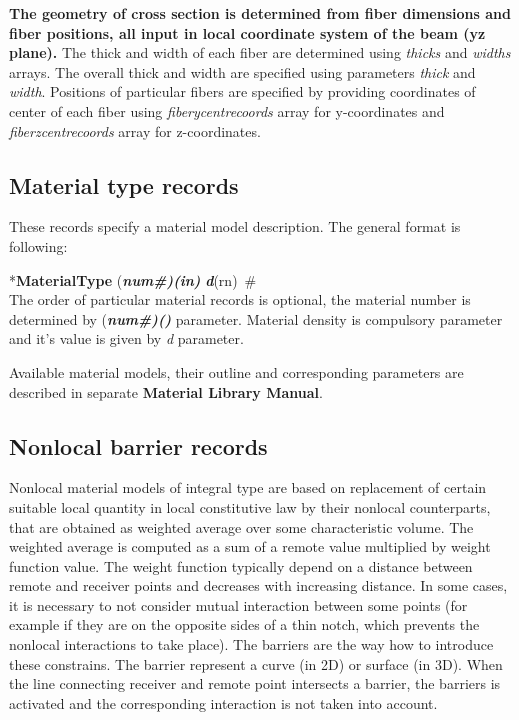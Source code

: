 \documentclass[draft]{article}
\newcommand{\param}[1]{{\em #1}}
\newcommand{\fieldVal}[2]{\mbox{({\it\bf{#1}\#)\tiny (#2)}}}
\newcommand{\keywordnotype}[1]{\mbox{{\it{\bf{#1}}}}}
\newcommand{\keyword}[2]{\mbox{{\keywordnotype{#1}\tiny (#2)}}}
\newcommand{\entKeyword}[1]{\mbox{{*{\bf{#1}}}}}
\newcommand{\entKeywordInst}[1]{\mbox{{\bf{{#1}}}}}
\newcommand{\field}[2]{\mbox{\keyword{#1}{#2}~\#}}
\begin{document}
\begin{itemize}
{\bf The geometry of cross section is determined from fiber dimensions and fiber positions, all input in local coordinate system of the beam (yz plane).} The thick and width of each fiber are determined using \param{thicks} and \param{widths} arrays. The overall thick and width are specified using parameters \param{thick} and \param{width}. Positions of particular fibers are specified by providing coordinates of center of each fiber using \param{fiberycentrecoords} array for y-coordinates and \param{fiberzcentrecoords} array for z-coordinates. 
\end{itemize}

\subsection{Material type  records}
\label{_MaterialTypeRecords}
These records specify a material model  description. The general format is
following:

\entKeyword{MaterialType} \fieldVal{num}{in} \field{d}{rn}\\

The order of particular material records is optional, the material number is determined by \fieldVal{num}{} parameter.
Material density is compulsory parameter and it's value is given by
\param{d} parameter.

Available material models, their outline and
corresponding parameters are described in separate {\bf Material Library Manual}.

\subsection{Nonlocal barrier records}
\label{_NonlocalBarrierRecords}
Nonlocal material models of integral type are based on replacement of
certain suitable local quantity in local constitutive law by their
nonlocal counterparts, that are obtained as weighted average over
some characteristic volume. The weighted average is computed as a sum
of a remote value multiplied by weight function value. The weight
function typically depend on a distance between remote and receiver
points and decreases with increasing distance. In some cases, it is
necessary to not consider mutual interaction between some points (for
example if they are on the opposite sides of a thin notch, which
prevents the nonlocal interactions to take place). The barriers are
the way how to introduce these constrains. The barrier represent a
curve (in 2D) or surface (in 3D). When the line connecting receiver and
remote point intersects a barrier, the barriers is activated and the
corresponding interaction is not taken into account.
\end{document}

